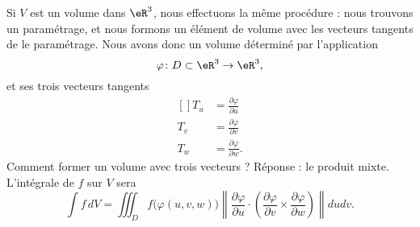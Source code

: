Si \( V\) est un volume dans \( \eR^3\), nous effectuons la même procédure : nous trouvons un paramétrage, et nous formons un élément de volume avec les vecteurs tangents de le paramétrage. Nous avons donc un volume déterminé par l'application
\begin{equation}
	\varphi\colon D\subset\eR^3\to \eR^3,
\end{equation}
et ses trois vecteurs tangents
\begin{equation}
	\begin{aligned}[]
		T_u & =\frac{ \partial \varphi }{ \partial u }  \\
		T_v & =\frac{ \partial \varphi }{ \partial v }  \\
		T_w & =\frac{ \partial \varphi }{ \partial w }.
	\end{aligned}
\end{equation}
Comment former un volume avec trois vecteurs ? Réponse : le produit mixte. L'intégrale de \( f\) sur \( V\) sera
\begin{equation}
	\int f\,dV=\iiint_D f\big( \varphi(u,v,w) \big)\left\| \frac{ \partial \varphi }{ \partial u }\cdot \left( \frac{ \partial \varphi }{ \partial v }\times\frac{ \partial \varphi }{ \partial w }\right) \right\|dudv.
\end{equation}

